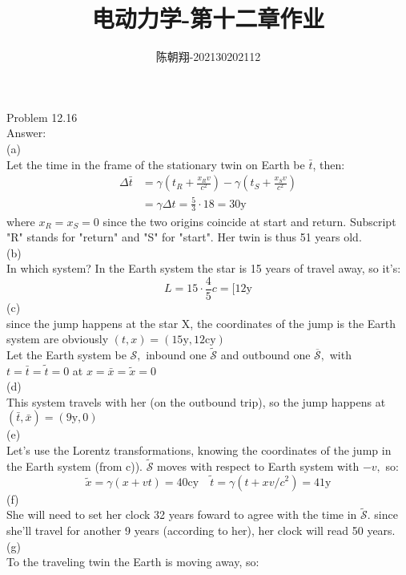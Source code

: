 \documentclass[UTF8]{ctexart}
\title{电动力学-第十二章作业}
\author{陈朝翔-202130202112}
\begin{document}
	\maketitle
	Problem 12.16\\
	Answer:\\
	(a)\\
	Let the time in the frame of the stationary twin on Earth be $\bar{t}$, then:\\
	$$\begin{aligned}
		\Delta \bar{t} &=\gamma\left(t_{R}+\frac{x_{R} v}{c^{2}}\right)-\gamma\left(t_{S}+\frac{x_{S} v}{c^{2}}\right) \\
		&=\gamma \Delta t=\frac{5}{3} \cdot 18=30 \mathrm{y}
	\end{aligned}$$
	where $x_{R}=x_{S}=0$ since the two origins coincide at start and return. Subscript "R" stands for "return" and "S" for "start". Her twin is thus 51 years old.\\
	(b)\\
	In which system? In the Earth system the star is 15 years of travel away, so it's:
	$$L=15 \cdot \frac{4}{5} c=[12 \mathrm{y}$$
	(c)\\
	since the jump happens at the star $\mathrm{X}$, the coordinates of the jump is the Earth system are obviously $(t, x)=(15 \mathrm{y}, 12 \mathrm{cy})$\\
	Let the Earth system be $\mathcal{S},$ inbound one $\tilde{\mathcal{S}}$ and outbound one $\overline{\mathcal{S}},$ with $t=\bar{t}=\tilde{t}=0$ at $x=\bar{x}=\tilde{x}=0$\\
	(d)\\
	This system travels with her (on the outbound trip), so the jump happens at $(\bar{t}, \bar{x})=(9 \mathrm{y}, 0)$\\
	(e)\\
	Let's use the Lorentz transformations, knowing the coordinates of the jump in the Earth system (from c)). $\tilde{\mathcal{S}}$ moves with respect to Earth system with $-v,$ so:\\
	$$\tilde{x}=\gamma(x+v t)=40 \mathrm{cy} \quad \tilde{t}=\gamma\left(t+x v / c^{2}\right)=41 \mathrm{y}$$
	(f)\\
	She will need to set her clock 32 years foward to agree with the time in $\tilde{\mathcal{S}} .$ since she'll travel for another 9 years (according to her), her clock will read 50 years.\\
	(g)\\
	To the traveling twin the Earth is moving away, so:\\
\end{document}
